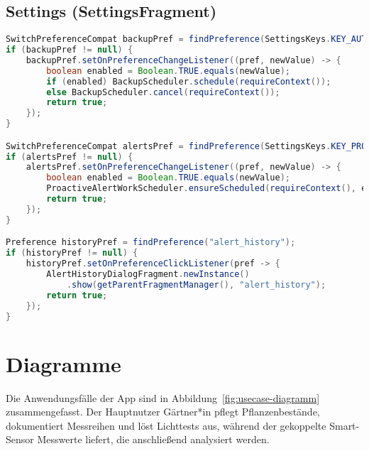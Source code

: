 \documentclass[14pt,a4paper]{report}
\begin{document}
\subsection*{Settings (SettingsFragment)}
\begin{lstlisting}[language=Java, caption={SettingsFragment.java (Auszug)}]
SwitchPreferenceCompat backupPref = findPreference(SettingsKeys.KEY_AUTO_BACKUP);
if (backupPref != null) {
    backupPref.setOnPreferenceChangeListener((pref, newValue) -> {
        boolean enabled = Boolean.TRUE.equals(newValue);
        if (enabled) BackupScheduler.schedule(requireContext());
        else BackupScheduler.cancel(requireContext());
        return true;
    });
}

SwitchPreferenceCompat alertsPref = findPreference(SettingsKeys.KEY_PROACTIVE_ALERTS_ENABLED);
if (alertsPref != null) {
    alertsPref.setOnPreferenceChangeListener((pref, newValue) -> {
        boolean enabled = Boolean.TRUE.equals(newValue);
        ProactiveAlertWorkScheduler.ensureScheduled(requireContext(), enabled);
        return true;
    });
}

Preference historyPref = findPreference("alert_history");
if (historyPref != null) {
    historyPref.setOnPreferenceClickListener(pref -> {
        AlertHistoryDialogFragment.newInstance()
            .show(getParentFragmentManager(), "alert_history");
        return true;
    });
}
\end{lstlisting}


\section{Diagramme}

\usetikzlibrary{positioning, arrows.meta}


Die Anwendungsfälle der App sind in Abbildung~\ref{fig:usecase-diagramm} zusammengefasst. Der Hauptnutzer \glqq Gärtner*in\grqq{} pflegt Pflanzenbestände, dokumentiert Messreihen und löst Lichttests aus, während der gekoppelte Smart-Sensor Messwerte liefert, die anschließend analysiert werden.
\end{document}
